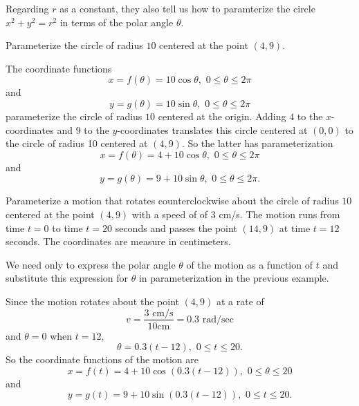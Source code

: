 \documentclass{ximera}
\begin{document}
Regarding $r$ as a constant, they also tell us how to paramterize the circle $x^2 + y^2 = r^2$ in terms of the polar angle $\theta$.

\begin{example} \label{Ex10:Cosine}
Parameterize the circle of radius $10$ centered at the point $(4,9)$.

\begin{explanation}
The coordinate functions
\[
     x = f(\theta) = 10\cos \theta  , \, \,   0\leq \theta \leq 2\pi
\]
and
\[
  y =g(\theta) = 10\sin \theta   , \,\, 0\leq \theta \leq 2\pi
\]
parameterize the circle of radius $10$ centered at the origin. Adding $4$ to the $x$-coordinates and $9$ to the $y$-coordinates translates this circle centered at $(0,0)$ to the circle of radius 10 centered at $(4,9)$. So the latter has parameterization
\[
     x = f(\theta) = 4+ 10\cos \theta ,  \,\,  0\leq \theta \leq 2\pi
\]
and
\[
  y = g(\theta) = 9 + 10\sin \theta  , \,\,   0\leq \theta \leq 2\pi .
\]
\end{explanation}
\end{example}


\begin{example} \label{Ex12:Cosine}
Parameterize a motion that rotates counterclockwise about the circle of radius $10$ centered at the point $(4,9)$ with a speed of of $3$ cm/s. The motion runs from time $t=0$ to time $t=20$ seconds and passes the point $(14,9)$ at time $t=12$ seconds. The coordinates are measure in centimeters.

\begin{explanation}
We need only to express the polar angle $\theta$ of the motion as a function of $t$ and substitute this expression for $\theta$ in parameterization in the previous example.

Since the motion rotates about the point $(4,9)$ at a rate of
\[
    v = \frac{3 \text{ cm/s}}{10 \text{cm}} = 0.3 \text{ rad/sec} 
\]
and $\theta = 0$ when $t=12$, 
\[
   \theta = 0.3(t-12) , \,\, 0\leq t \leq 20 .
\]
So the coordinate functions of the motion are
\[
     x = f(t) = 4+ 10\cos (0.3(t-12)) ,  \,\,  0\leq \theta \leq 20
\]
and
\[
  y = g(t) = 9 + 10\sin (0.3(t-12))  , \,\,   0\leq t\leq 20 .
\]
\end{explanation}
\end{example}
\end{document}

